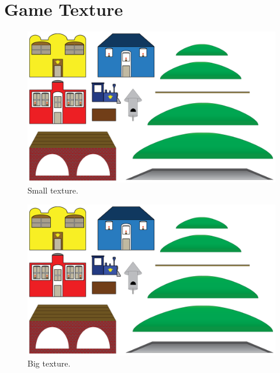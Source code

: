 \chapter{Game Texture}

\begin{figure}[H]
\centering
\includegraphics[page=2,angle=90,scale=0.87]{img/alltexture.pdf}
\caption{Small texture.}
\label{fig:wombat}
\end{figure}

\begin{figure}[H]
\centering
\includegraphics[page=1,angle=90,scale=0.22]{img/alltexture.pdf}
\caption{Big texture.}
\label{fig:wombat}
\end{figure}
